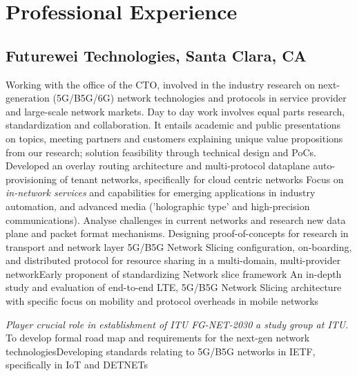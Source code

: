 \documentclass[11pt,a4paper,sans]{moderncv} %
\begin{document}

\section{Professional Experience}
\subsection{Futurewei Technologies, Santa Clara, CA}
{Working with the office of the CTO, involved in the industry research on next-generation (5G/B5G/6G) network technologies and protocols in service provider and large-scale network markets. Day to day work involves equal parts research, standardization and collaboration. It entails academic and public presentations on topics, meeting partners and customers explaining unique value propositions from our research; solution feasibility through technical design and PoCs.\\
}
{Developed an overlay routing architecture and multi-protocol dataplane auto-provisioning of tenant networks, specifically for cloud centric networks}{}
{Focus on \textit{in-network services} and capabilities for emerging applications in industry automation, and advanced media ('holographic type' and high-precision communications). Analyse challenges in current networks and research new data plane and packet format mechanisms. Designing proof-of-concepts for research in transport and network layer}{}
{5G/B5G Network Slicing configuration, on-boarding, and  distributed protocol for resource sharing in a multi-domain, multi-provider network}{Early proponent of standardizing Network slice framework} {}
{An in-depth study and evaluation of end-to-end LTE, 5G/B5G Network Slicing architecture with specific focus on mobility and protocol overheads in mobile networks} {}

 {\textit{Player crucial role in establishment of ITU FG-NET-2030}}{}{}
 {\emph{a study group at ITU}. To develop formal road map and requirements for the next-gen network technologies}{Developing standards relating to 5G/B5G networks in IETF, specifically in IoT and DETNETs}
\end{document}
